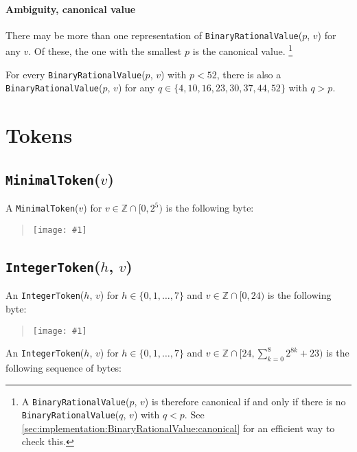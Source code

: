 \documentclass[headings=normal, headsepline, numbers=noenddot, fleqn, a4paper]{scrartcl}
\let\mathbbm\mathds
\newcommand{\SetOfIntegers}{\mathbbm{Z}}
\newcommand{\DborSyntaxIdent}[1]{\texttt{#1}}
\newcommand{\IncludeImageInPlace}[1]{%
    \begin{quotation}%
        \texttt{[image: \#1]}%
    \end{quotation}%
}
\begin{document}
    \paragraph{Ambiguity, canonical value}

    There may be more than one representation of \DborSyntaxIdent{Binary\-Rational\-Value}($p$, $v$) for any $v$.
    Of these, the one with the smallest $p$ is the canonical value.%
    \footnote{
        A \DborSyntaxIdent{BinaryRationalValue}($p$, $v$) is therefore canonical if and only if there is
        no \DborSyntaxIdent{BinaryRationalValue}($q$, $v$) with $q < p$.
        See \ref{sec:implementation:BinaryRationalValue:canonical} for an efficient way to check this.
    }
    
    For every \DborSyntaxIdent{Binary\-Rational\-Value}($p$, $v$) with $p < 52$, there is also
    a \DborSyntaxIdent{Binary\-Rational\-Value}($p$, $v$) for any
    $q \in \{4, 10, 16, 23, 30, 37, 44, 52\}$ with $q > p$.

    
    \section{Tokens}
    \label{sec:tokens}

    \subsection{\DborSyntaxIdent{MinimalToken}($v$)}
    \hypertarget{sec:def:MinimalToken}{}

    A \DborSyntaxIdent{MinimalToken}($v$) for $v \in \SetOfIntegers \cap [0, 2^5)$
    is the following byte:

    \IncludeImageInPlace{MinimalToken.pdf}


    \subsection{\DborSyntaxIdent{IntegerToken}($h$, $v$)}
    \hypertarget{sec:def:IntegerToken}{}

    An \DborSyntaxIdent{IntegerToken}($h$, $v$) for $h \in \{0, 1, \ldots, 7\}$ and
    $v \in \SetOfIntegers \cap [0, 24)$ is the following byte:

    \IncludeImageInPlace{IntegerTokenA.pdf}
    
    An \DborSyntaxIdent{IntegerToken}($h$, $v$) for $h \in \{0, 1, \ldots, 7\}$ and
    $v \in \SetOfIntegers \cap [24, \sum_{k = 0}^8 2^{8k} + 23)$
    is the following sequence of bytes:
\end{document}
